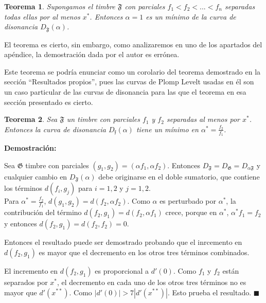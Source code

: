 \documentclass[11pt,a4paper]{article}
\newtheorem{teor}{Teorema}
\begin{document}
	\begin{teor}                      %
	Supongamos el timbre $\mathfrak{F}$ con parciales $f_1< f_2 <... < f_n$ separadas todas ellas por al menos $x^{*}$. Entonces $\alpha = 1$ es un mínimo de la curva de disonancia $D_{\mathfrak{F}}(\alpha)$.
	\end{teor}

    El teorema es cierto, sin embargo, como analizaremos en uno de los apartados del apéndice, la demostración dada por el autor es errónea.
    
    Este teorema se podría enunciar como un corolario del teorema demostrado en la sección ``Resultados propios'', pues las curvas de Plomp Levelt usadas en él son un caso particular de las curvas de disonancia para las que el teorema en esa sección presentado es cierto.


	\begin{teor}                      %
	Sea $\mathfrak{F}$ un timbre con parciales $f_1$ y $f_2$ separadas al menos por $x^{*}$. Entonces la curva de disonancia $D_{\mathfrak{f}}(\alpha)$ tiene un mí­nimo en $\alpha^{*} = \frac{f_2}{f_1}$.
	\end{teor}
	
	\noindent\textbf{Demostración:} 

Sea $\mathfrak{G}$ timbre con parciales $(g_1, g_2) = (\alpha f_1, \alpha f_2)$. Entonces $D_{\mathfrak{F}} = D_{\mathfrak{G}} = D_{\alpha \mathfrak{F}} $ y cualquier cambio en $D_{\mathfrak{F}} (\alpha)$ debe originarse en el doble sumatorio, que contiene los términos $d(f_i, g_j)$  para $i = 1, 2$ y $j = 1, 2$.\\
Para $\alpha^{*} = \frac{f_2}{f_1}$, $d(g_1, g_2) = d(f_2, \alpha f_2)$. Como $\alpha$ es perturbado por $\alpha^{*}$, la contribución del término $d(f_2, g_1) = d(f_2, \alpha f_1)$ crece, porque en $\alpha^{*}$, $\alpha^{*} f_1 = f_2$ y entonces $d(f_2, g_1) = d(f_2, f_2) = 0$.

Entonces el resultado puede ser demostrado probando que el inrcemento en $d(f_2, g_1)$ es mayor que el decremento en los otros tres términos combinados. 

El incremento en $d(f_2, g_1)$ es proporcional a $d'(0)$. Como $f_1$ y $f_2$ están separados por $x^{*}$, el decremento en cada uno de los otros tres términos no es mayor que $d'(x^{**})$.  Como $| d'(0) | > 7 | d'(x^{**}) | $. Esto prueba el resultado.
$\blacksquare$
\end{document}
